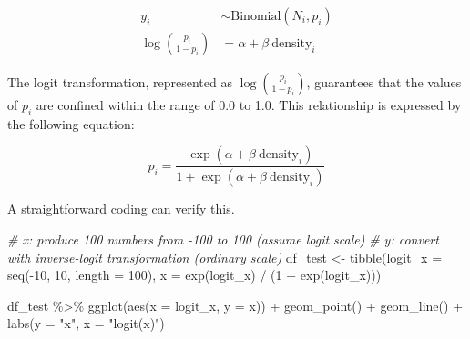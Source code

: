 \documentclass[
]{article}
\newenvironment{Shaded}{\begin{snugshade}}{\end{snugshade}}
\newcommand{\AttributeTok}[1]{\textcolor[rgb]{0.77,0.63,0.00}{#1}}
\newcommand{\CommentTok}[1]{\textcolor[rgb]{0.56,0.35,0.01}{\textit{#1}}}
\newcommand{\DecValTok}[1]{\textcolor[rgb]{0.00,0.00,0.81}{#1}}
\newcommand{\FunctionTok}[1]{\textcolor[rgb]{0.00,0.00,0.00}{#1}}
\newcommand{\NormalTok}[1]{#1}
\newcommand{\OtherTok}[1]{\textcolor[rgb]{0.56,0.35,0.01}{#1}}
\newcommand{\SpecialCharTok}[1]{\textcolor[rgb]{0.00,0.00,0.00}{#1}}
\newcommand{\StringTok}[1]{\textcolor[rgb]{0.31,0.60,0.02}{#1}}
\begin{document}
\[
\begin{aligned}
y_i &\sim \text{Binomial}(N_i, p_i)\\
\log(\frac{p_i}{1-p_i}) &= \alpha + \beta~\text{density}_i 
\end{aligned}
\]

The logit transformation, represented as \(\log\left(\frac{p_i}{1-p_i}\right)\), guarantees that the values of \(p_i\) are confined within the range of 0.0 to 1.0. This relationship is expressed by the following equation:

\[
p_i = \frac{\exp(\alpha + \beta~\text{density}_i)}{1 + \exp(\alpha + \beta~\text{density}_i)}
\]

A straightforward coding can verify this.

\begin{Shaded}
\begin{Highlighting}[]
\CommentTok{\# x: produce 100 numbers from {-}100 to 100 (assume logit scale)}
\CommentTok{\# y: convert with inverse{-}logit transformation (ordinary scale)}
\NormalTok{df\_test }\OtherTok{\textless{}{-}} \FunctionTok{tibble}\NormalTok{(}\AttributeTok{logit\_x =} \FunctionTok{seq}\NormalTok{(}\SpecialCharTok{{-}}\DecValTok{10}\NormalTok{, }\DecValTok{10}\NormalTok{, }\AttributeTok{length =} \DecValTok{100}\NormalTok{),}
                  \AttributeTok{x =} \FunctionTok{exp}\NormalTok{(logit\_x) }\SpecialCharTok{/}\NormalTok{ (}\DecValTok{1} \SpecialCharTok{+} \FunctionTok{exp}\NormalTok{(logit\_x)))}

\NormalTok{df\_test }\SpecialCharTok{\%\textgreater{}\%} 
  \FunctionTok{ggplot}\NormalTok{(}\FunctionTok{aes}\NormalTok{(}\AttributeTok{x =}\NormalTok{ logit\_x,}
             \AttributeTok{y =}\NormalTok{ x)) }\SpecialCharTok{+}
  \FunctionTok{geom\_point}\NormalTok{() }\SpecialCharTok{+}
  \FunctionTok{geom\_line}\NormalTok{() }\SpecialCharTok{+}
  \FunctionTok{labs}\NormalTok{(}\AttributeTok{y =} \StringTok{"x"}\NormalTok{,}
       \AttributeTok{x =} \StringTok{"logit(x)"}\NormalTok{)}
\end{Highlighting}
\end{Shaded}
\end{document}
